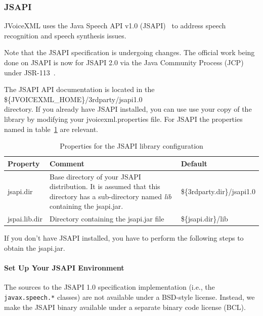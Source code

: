 \documentclass[11pt,a4paper]{article}
\begin{document}
\subsubsection{JSAPI}
\label{sec:jsapi}

JVoiceXML uses the Java Speech API v1.0 (JSAPI)~\cite{sun:jsapi} to address 
speech recognition and speech synthesis issues.

Note that the JSAPI specification is undergoing changes.
The official work being done on JSAPI is now for JSAPI 2.0 via
the Java Community Process (JCP)~\cite{jcp} under 
JSR-113~\cite{jcp:jsr113}.

The JSAPI API documentation is located in the \\
\$\{JVOICEXML\_HOME\}/3rdparty/jsapi1.0 \\
directory. If you already have JSAPI installed, you can use
use your copy of the library by modifying your jvoicexml.properties file.
For JSAPI the properties named in table~\ref{tab:jsapi_properties} are 
relevant.

\begin{table}[h]
\caption{Properties for the JSAPI library configuration}
\label{tab:jsapi_properties}

\begin{center}

\begin{tabular}{|l|p{4cm}|l|}
\hline
\textbf{Property} & \textbf{Comment} & \textbf{Default} \\
\hline
\hline
jsapi.dir & 
Base directory of your JSAPI distribution. It is assumed that this directory
has a sub-directory named \emph{lib} containing the jsapi.jar.
& \$\{3rdparty.dir\}/jsapi1.0 \\
\hline
jspai.lib.dir & 
Directory containing the jsapi.jar file 
& \$\{jsapi.dir\}/lib \\
\hline
\end{tabular}
\end{center}

\end{table}

If you don't have JSAPI installed, you have to perform the following steps 
to obtain the jsapi.jar.

\paragraph{Set Up Your JSAPI Environment}

The sources to the JSAPI 1.0 specification implementation (i.e., the
\texttt{javax.speech.*} classes) are not available under a
BSD-style license.  Instead, we make the JSAPI binary
available under a separate binary code license (BCL).
\end{document}
